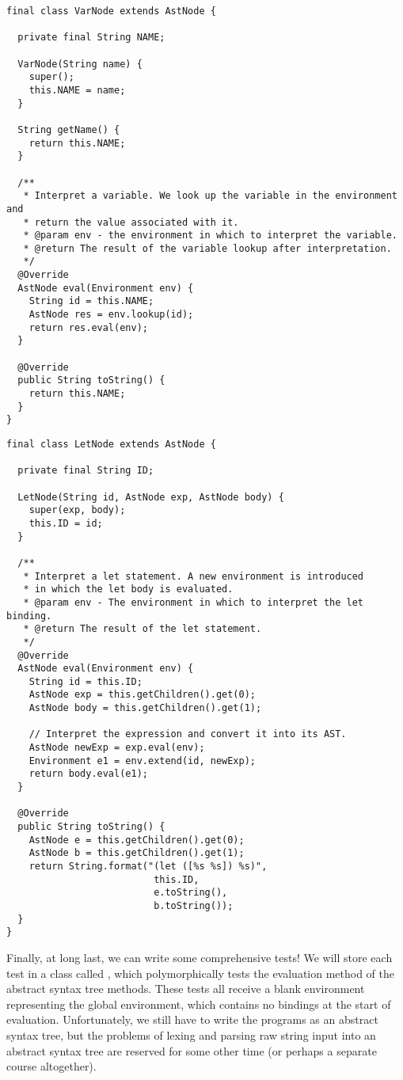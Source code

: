\begin{lstlisting}[language=MyJava]
final class VarNode extends AstNode {

  private final String NAME;

  VarNode(String name) {
    super();
    this.NAME = name;
  }

  String getName() {
    return this.NAME;
  }

  /**
   * Interpret a variable. We look up the variable in the environment and
   * return the value associated with it.
   * @param env - the environment in which to interpret the variable.
   * @return The result of the variable lookup after interpretation.
   */
  @Override
  AstNode eval(Environment env) {
    String id = this.NAME;
    AstNode res = env.lookup(id);
    return res.eval(env);
  }

  @Override
  public String toString() { 
    return this.NAME; 
  }
}
\end{lstlisting}
  
\begin{lstlisting}[language=MyJava]
final class LetNode extends AstNode {

  private final String ID;

  LetNode(String id, AstNode exp, AstNode body) {
    super(exp, body);
    this.ID = id;
  }

  /**
   * Interpret a let statement. A new environment is introduced 
   * in which the let body is evaluated.
   * @param env - The environment in which to interpret the let binding.
   * @return The result of the let statement.
   */
  @Override
  AstNode eval(Environment env) {
    String id = this.ID;
    AstNode exp = this.getChildren().get(0);
    AstNode body = this.getChildren().get(1);

    // Interpret the expression and convert it into its AST.
    AstNode newExp = exp.eval(env);
    Environment e1 = env.extend(id, newExp);
    return body.eval(e1);
  }

  @Override
  public String toString() {
    AstNode e = this.getChildren().get(0);
    AstNode b = this.getChildren().get(1);
    return String.format("(let ([%s %s]) %s)", 
                          this.ID, 
                          e.toString(), 
                          b.toString());
  }
}
\end{lstlisting}

Finally, at long last, we can write some comprehensive tests! We will store each test in a class called , which polymorphically tests the evaluation method of the abstract syntax tree methods. These tests all receive a blank environment representing the global environment, which contains no bindings at the start of evaluation. Unfortunately, we still have to write the programs as an abstract syntax tree, but the problems of lexing and parsing raw string input into an abstract syntax tree are reserved for some other time (or perhaps a separate course altogether).

